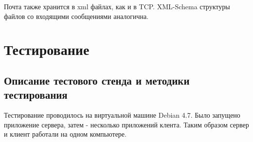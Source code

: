 \documentclass[12pt,a4paper]{report}
\begin{document}
Почта также хранится в xml файлах, как и в TCP. XML-Schema структуры файлов со входящими сообщениями аналогична.


\section{Тестирование}
\subsection{Описание тестового стенда и методики тестирования}
Тестирование проводилось на виртуальной машине Debian 4.7. Было запущено приложение сервера, затем - несколько приложений клента. Таким образом сервер и клиент работали на одном компьютере.
\end{document}
